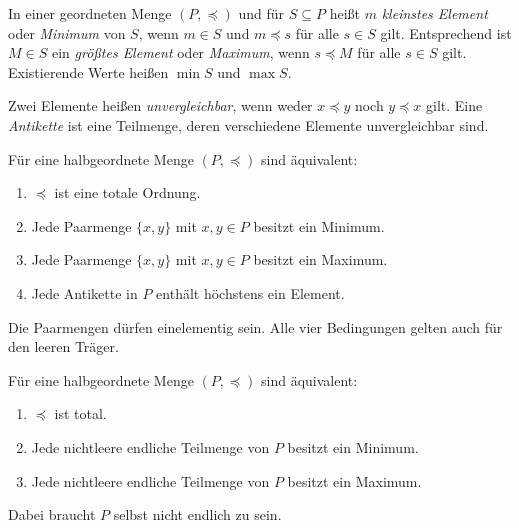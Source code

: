 \begin{definition}
\label{b15guide:def:extreme}
In einer geordneten Menge $(P,\preceq)$ und für $S\subseteq P$
heißt $m$ \emph{kleinstes Element} oder \emph{Minimum} von $S$,
wenn $m\in S$ und $m\preceq s$ für alle $s\in S$ gilt.
Entsprechend ist $M\in S$ ein \emph{größtes Element} oder
\emph{Maximum}, wenn $s\preceq M$ für alle $s\in S$ gilt.
Existierende Werte heißen $\min S$ und $\max S$.

Zwei Elemente heißen \emph{unvergleichbar}, wenn weder
$x\preceq y$ noch $y\preceq x$ gilt. Eine \emph{Antikette}
ist eine Teilmenge, deren verschiedene Elemente unvergleichbar sind.
\end{definition}

\begin{theorem}
\label{b15guide:thm:pair-criteria}
Für eine halbgeordnete Menge $(P,\preceq)$ sind äquivalent:
\begin{enumerate}
 \item $\preceq$ ist eine totale Ordnung.
 \item Jede Paarmenge $\{x,y\}$ mit $x,y\in P$ besitzt ein Minimum.
 \item Jede Paarmenge $\{x,y\}$ mit $x,y\in P$ besitzt ein Maximum.
 \item Jede Antikette in $P$ enthält höchstens ein Element.
\end{enumerate}
Die Paarmengen dürfen einelementig sein. Alle vier Bedingungen
gelten auch für den leeren Träger.
\end{theorem}

\begin{theorem}
\label{b15guide:thm:finite-criterion}
Für eine halbgeordnete Menge $(P,\preceq)$ sind äquivalent:
\begin{enumerate}
 \item $\preceq$ ist total.
 \item Jede nichtleere endliche Teilmenge von $P$ besitzt ein Minimum.
 \item Jede nichtleere endliche Teilmenge von $P$ besitzt ein Maximum.
\end{enumerate}
Dabei braucht $P$ selbst nicht endlich zu sein.
\end{theorem}
